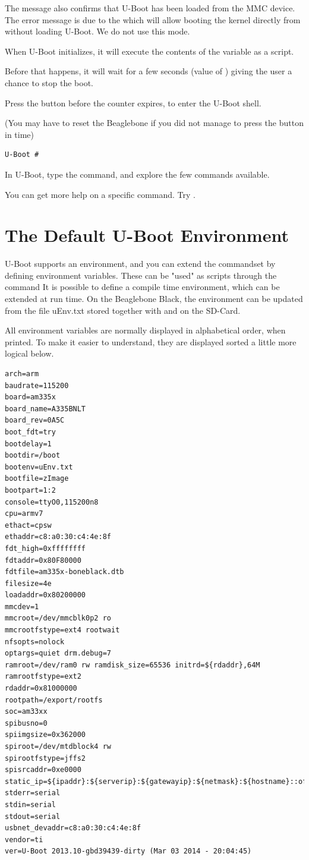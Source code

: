The message  also confirms that U-Boot has
been loaded from the MMC device. The error message is due to the  which
will allow booting the kernel directly from  without loading U-Boot. We do not use this mode.

When U-Boot initializes, it will execute the contents of the  variable as a script.

Before that happens, it will wait for a few seconds (value of ) giving
the user a chance to stop the boot. 

Press the  button before the counter expires, to enter the U-Boot shell.

(You may have to reset the Beaglebone if you did not manage to press the  button in time)
\begin{verbatim}
U-Boot #
\end{verbatim}

In U-Boot, type the  command, and explore the few commands available.

You can get more help on a specific command. Try .

\clearpage

\section{The Default U-Boot Environment}
U-Boot supports an environment, and you can extend the commandset by defining environment variables.
These can be "used" as scripts through the  command 
It is possible to define a compile time environment, which can be extended at run time.
On the Beaglebone Black, the environment can be updated from the file uEnv.txt stored
together with  and  on the SD-Card.

All environment variables are normally displayed in alphabetical order, when printed.
To make it easier to understand, they are displayed sorted a little more logical below.

\begin{lstlisting}
arch=arm
baudrate=115200
board=am335x
board_name=A335BNLT
board_rev=0A5C
boot_fdt=try
bootdelay=1
bootdir=/boot
bootenv=uEnv.txt
bootfile=zImage
bootpart=1:2
console=ttyO0,115200n8
cpu=armv7
ethact=cpsw
ethaddr=c8:a0:30:c4:4e:8f
fdt_high=0xffffffff
fdtaddr=0x80F80000
fdtfile=am335x-boneblack.dtb
filesize=4e
loadaddr=0x80200000
mmcdev=1
mmcroot=/dev/mmcblk0p2 ro
mmcrootfstype=ext4 rootwait
nfsopts=nolock
optargs=quiet drm.debug=7
ramroot=/dev/ram0 rw ramdisk_size=65536 initrd=${rdaddr},64M
ramrootfstype=ext2
rdaddr=0x81000000
rootpath=/export/rootfs
soc=am33xx
spibusno=0
spiimgsize=0x362000
spiroot=/dev/mtdblock4 rw
spirootfstype=jffs2
spisrcaddr=0xe0000
static_ip=${ipaddr}:${serverip}:${gatewayip}:${netmask}:${hostname}::off
stderr=serial
stdin=serial
stdout=serial
usbnet_devaddr=c8:a0:30:c4:4e:8f
vendor=ti
ver=U-Boot 2013.10-gbd39439-dirty (Mar 03 2014 - 20:04:45)
\end{lstlisting}

